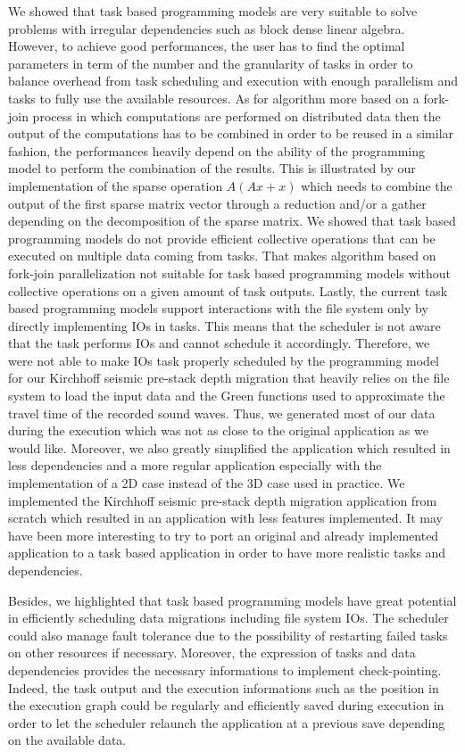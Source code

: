 We showed that task based programming models are very suitable to solve problems with irregular dependencies such as block dense linear algebra.
However, to achieve good performances, the user has to find the optimal parameters in term of the number and the granularity of tasks in order to balance overhead from task scheduling and execution with enough parallelism and tasks to fully use the available resources.
As for algorithm more based on a fork-join process in which computations are performed on distributed data then the output of the computations has to be combined in order to be reused in a similar fashion, the performances heavily depend on the ability of the programming model to perform the combination of the results.
This is illustrated by our implementation of the sparse operation $A(Ax+x)$ which needs to combine the output of the first sparse matrix vector through a reduction and/or a gather depending on the decomposition of the sparse matrix.
We showed that task based programming models do not provide efficient collective operations that can be executed on multiple data coming from tasks.
That makes algorithm based on fork-join parallelization not suitable for task based programming models without collective operations on a given amount of task outputs.
Lastly, the current task based programming models support interactions with the file system only by directly implementing IOs in tasks.
This means that the scheduler is not aware that the task performs IOs and cannot schedule it accordingly.
Therefore, we were not able to make IOs task properly scheduled by the programming model for our Kirchhoff seismic pre-stack depth migration that heavily relies on the file system to load the input data and the Green functions used to approximate the travel time of the recorded sound waves.
Thus, we generated most of our data during the execution which was not as close to the original application as we would like.
Moreover, we also greatly simplified the application which resulted in less dependencies and a more regular application especially with the implementation of a 2D case instead of the 3D case used in practice.
We implemented the Kirchhoff seismic pre-stack depth migration application from scratch which resulted in an application with less features implemented.
It may have been more interesting to try to port an original and already implemented application to a task based application in order to have more realistic tasks and dependencies.

Besides, we highlighted that task based programming models have great potential in efficiently scheduling data migrations including file system IOs.
The scheduler could also manage fault tolerance due to the possibility of restarting failed tasks on other resources if necessary.
Moreover, the expression of tasks and data dependencies provides the necessary informations to implement check-pointing.
Indeed, the task output and the execution informations such as the position in the execution graph could be regularly and efficiently saved during execution in order to let the scheduler relaunch the application at a previous save depending on the available data.

